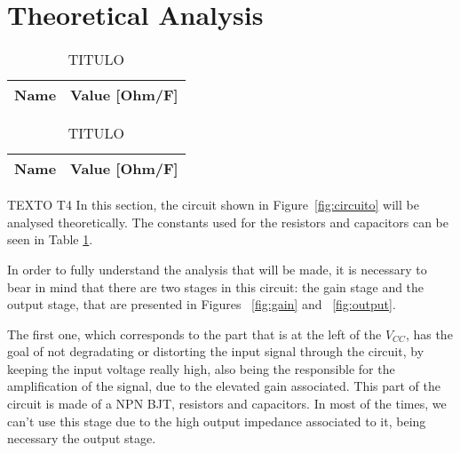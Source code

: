 \section{Theoretical Analysis}
\label{sec:analysis}

\begin{table}[H]
  \centering
  \begin{tabular}{|l|r|}
    \hline    
    {\bf Name} & {\bf Value [Ohm/F]} \\ \hline
    
  \end{tabular}
  \caption{TITULO}
  \label{tab:mat1}
\end{table}

\begin{table}[H]
  \centering
  \begin{tabular}{|l|r|}
    \hline    
    {\bf Name} & {\bf Value [Ohm/F]} \\ \hline
    
  \end{tabular}
  \caption{TITULO}
  \label{tab:mat2}
\end{table}



TEXTO T4 
\hspace{0,5cm} In this section, the  circuit shown in Figure~\ref{fig:circuito} will be analysed theoretically.
The constants used for the resistors and capacitors can be seen in Table \ref{tab:mat1}.



\par In order to fully understand the analysis that will be made, it is necessary to bear in mind that there are two stages in this circuit: the gain stage and the output stage, that are presented in Figures ~\ref{fig:gain} and ~\ref{fig:output}. 

\par The first one, which corresponds to the part that is at the left of the $V_{CC}$, has the goal of not degradating or distorting the input signal through the circuit, by keeping the input voltage really high, also being the responsible for the amplification of the signal, due to the elevated gain associated. This part of the circuit is made of a NPN BJT, resistors and capacitors. In most of the times, we can't use this stage due to the high output impedance associated to it, being necessary the output stage.


